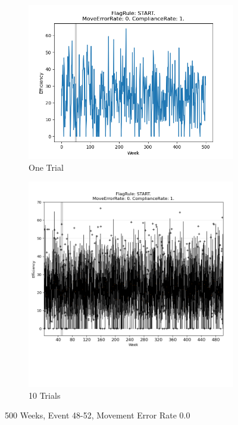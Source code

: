 \documentclass{article}%
\begin{document}
%


\begin{figure}[!htb]%
\begin{subfigure}[b]{0.45\linewidth}%
\includegraphics[width=\linewidth]{1001fr_START_er_0_cr_1_t1.png}%
\caption{One Trial}%
\end{subfigure}%
\begin{subfigure}[b]{0.45\linewidth}%
\includegraphics[clip,width=\linewidth,trim=0 4cm 0 0]{1001fr_START_er_0_cr_1_t10.png}%
\caption{10 Trials}%
\end{subfigure}%
\caption{500 Weeks, Event 48{-}52, Movement Error Rate 0.0}%
\end{figure}
\end{document}
